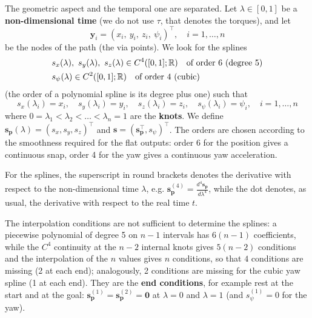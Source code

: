 \documentclass[10pt, a4paper]{report}
\newcommand{\y}{{\mathbf y}}
\begin{document}
\noindent The geometric aspect and the temporal one are separated. Let $\lambda\in[0,1]$ be a \textbf{non-dimensional time} (we do not use $\tau$, that denotes the torques), and let\begin{equation}
    \y_i=(x_i,\ y_i,\ z_i,\ \psi_i)^\top,\quad i=1,\dots,n
\end{equation}
be the nodes of the path (the via points). We look for the splines\begin{align}
    &s_x(\lambda),\ s_y(\lambda),\ s_z(\lambda)\in C^4([0,1];{\mathbb R})\quad\text{of order 6 (degree 5)}\\
    &s_\psi(\lambda)\in C^2([0,1];{\mathbb R})\quad\text{of order 4 (cubic)}
\end{align}
(the order of a polynomial spline is its degree plus one) such that\begin{equation}
    s_x(\lambda_i)=x_i,\quad s_y(\lambda_i)=y_i,\quad s_z(\lambda_i)=z_i,\quad s_\psi(\lambda_i)=\psi_i,\quad i=1,\dots,n
\end{equation}
where $0=\lambda_1<\lambda_2<\dots<\lambda_n=1$ are the \textbf{knots}. We define $\mathbf s_{\mathbf p}(\lambda)=(s_x,s_y,s_z)^\top$ and $\mathbf s=(\mathbf s_{\mathbf p}^\top,s_\psi)^\top$. The orders are chosen according to the smoothness required for the flat outputs: order 6 for the position gives a continuous snap, order 4 for the yaw gives a continuous yaw acceleration.
\begin{boxnotation}{}{}
    For the splines, the superscript in round brackets denotes the derivative with respect to the non-dimensional time $\lambda$, e.g. $\mathbf s_{\mathbf p}^{(4)}=\frac{d^4\mathbf s_{\mathbf p}}{d\lambda^4}$, while the dot denotes, as usual, the derivative with respect to the real time $t$.
\end{boxnotation}
\noindent The interpolation conditions are not sufficient to determine the splines: a piecewise polynomial of degree 5 on $n-1$ intervals has $6(n-1)$ coefficients, while the $C^4$ continuity at the $n-2$ internal knots gives $5(n-2)$ conditions and the interpolation of the $n$ values gives $n$ conditions, so that $4$ conditions are missing (2 at each end); analogously, 2 conditions are missing for the cubic yaw spline (1 at each end). They are the \textbf{end conditions}, for example rest at the start and at the goal: $\mathbf s_{\mathbf p}^{(1)}=\mathbf s_{\mathbf p}^{(2)}=\mathbf 0$ at $\lambda=0$ and $\lambda=1$ (and $s_\psi^{(1)}=0$ for the yaw).
\end{document}
